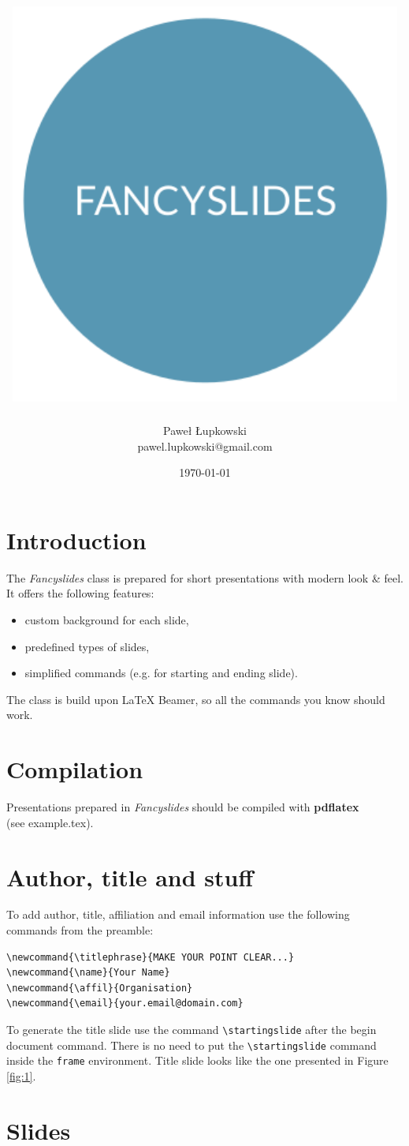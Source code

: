 \documentclass[11pt]{article}
\title{\includegraphics[scale=1]{fs}}
\author{Paweł Łupkowski\\pawel.lupkowski@gmail.com}
\date{\today}
\begin{document}
\maketitle


\section*{Introduction}

\noindent
The \textit{Fancyslides} class is prepared for short presentations with modern look \& feel. It offers the following features:
\begin{itemize}
\item custom background for each slide,
\item predefined types of slides,
\item simplified commands (e.g. for starting and ending slide).
\end{itemize}

The class is build upon \LaTeX{} Beamer, so all the commands you know should work.  


\section*{Compilation}

\noindent
Presentations prepared in \textit{Fancyslides} should be compiled with \textbf{pdflatex}\\ (see example.tex).


\section*{Author, title and stuff}

To add author, title, affiliation and email information use the following commands from the preamble:

\begin{verbatim}
\newcommand{\titlephrase}{MAKE YOUR POINT CLEAR...}
\newcommand{\name}{Your Name}
\newcommand{\affil}{Organisation}
\newcommand{\email}{your.email@domain.com}
\end{verbatim}


To generate the title slide use the command {\tt \textbackslash startingslide} after the begin document command. There is no need to put the {\tt \textbackslash startingslide} command inside the {\tt frame} environment. Title slide looks like the one presented in Figure \ref{fig:1}.


\section*{Slides}
\end{document}
